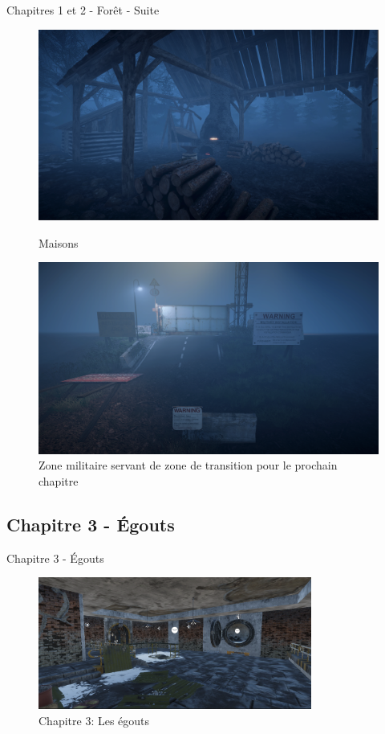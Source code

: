 \begin{frame}{Chapitres 1 et 2 - Forêt - Suite}
\begin{figure}[H]
\centering
\begin{minipage}{.5\textwidth}
  \centering
  \includegraphics[width=.9\linewidth]{img/gameplay/hallo/house.png}
  \caption{Maisons}
  \label{fig:houses}
\end{minipage}%
\begin{minipage}{.5\textwidth}
  \centering
  \includegraphics[width=.9\linewidth]{img/gameplay/hallo/military.png}
  \caption{Zone militaire servant de zone de transition pour le prochain chapitre}
  \label{fig:military}
\end{minipage}
\end{figure}
\end{frame}

\subsection{Chapitre 3 - Égouts}
\begin{frame}{Chapitre 3 - Égouts}
\begin{figure}
    \centering
    \includegraphics[width=9cm]{img/egouts/1.PNG}
    \caption{Chapitre 3: Les égouts}
    \label{fig:galaxy}
\end{figure}
\end{frame}

